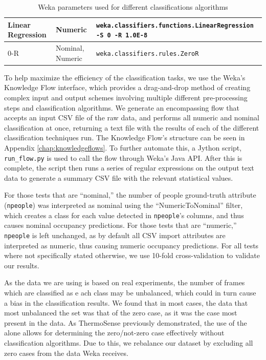 \documentclass[../thesis/thesis.tex]{subfiles}
\begin{document}
\begin{table}
\begin{tabular}{|p{40mm}|p{20mm}|p{70mm}|}
Linear Regression & Numeric & \texttt{weka.classifiers.functions\newline.LinearRegression \newline -S 0 -R 1.0E-8} \\ \hline

0-R & Nominal, \newline Numeric & \texttt{weka.classifiers.rules.ZeroR} \\ \hline
\end{tabular}
\caption{Weka parameters used for different classifications algorithms}
\label{tab:methods:params}
\end{table}

To help maximize the efficiency of the classification tasks, we use the Weka's Knowledge Flow interface, which provides a drag-and-drop method of creating complex input and output schemes involving multiple different pre-processing steps and classification algorithms. We generate an encompassing flow that accepts an input CSV file of the raw data, and performs all numeric and nominal classification at once, returning a text file with the results of each of the different classification techniques run. The Knowledge Flow's structure can be seen in Appendix \ref{chap:knowledgeflows}. To further automate this, a Jython script, \texttt{run\_flow.py} is used to call the flow through Weka's Java API. After this is complete, the script then runs a series of regular expressions on the output text data to generate a summary CSV file with the relevant statistical values.

For those tests that are ``nominal,'' the number of people ground-truth attribute (\texttt{npeople}) was interpreted as nominal using the ``NumericToNominal'' filter, which creates a class for each value detected in \texttt{npeople}'s columns, and thus causes nominal occupancy predictions. For those tests that are ``numeric,'' \texttt{npeople} is left unchanged, as by default all CSV import attributes are interpreted as numeric, thus causing numeric occupancy predictions. For all tests where not specifically stated otherwise, we use 10-fold cross-validation to validate our results.

As the data we are using is based on real experiments, the number of frames which are classified as e ach class may be unbalanced, which could in turn cause a bias in the classification results. We found that in most cases, the data that most unbalanced the set was that of the zero case, as it was the case most present in the data. As ThermoSense previously demonstrated, the use of the \pir alone allows for determining the zero/not-zero case effectively without classification algorithms. Due to this, we rebalance our dataset by excluding all zero cases from the data Weka receives.
\end{document}
